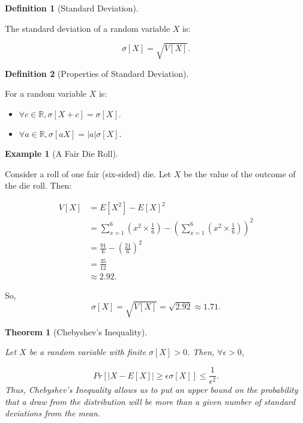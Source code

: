 \documentclass[
]{article}
\providecommand{\tightlist}{%
  \setlength{\itemsep}{0pt}\setlength{\parskip}{0pt}}
\newtheorem{theorem}{Theorem}[section]
\theoremstyle{definition}
\newtheorem{definition}{Definition}[section]
\theoremstyle{definition}
\newtheorem{example}{Example}[section]
\theoremstyle{definition}
\theoremstyle{remark}
\begin{document}
\begin{definition}[Standard Deviation]
\protect\hypertarget{def:unlabeled-div-69}{}\label{def:unlabeled-div-69}

The standard deviation of a random variable \(X\) is:

\[\sigma[X] = \sqrt{V[X]}.\]

\end{definition}

\begin{definition}[Properties of Standard Deviation]
\protect\hypertarget{def:unlabeled-div-70}{}\label{def:unlabeled-div-70}

For a random variable \(X\) is:

\begin{itemize}
\tightlist
\item
  \(\forall c \in \mathbb{R}, \sigma[X + c] = \sigma[X].\)
\item
  \(\forall a \in \mathbb{R}, \sigma[aX] = \left| a \right|\sigma[X].\)
\end{itemize}

\end{definition}

\begin{example}[A Fair Die Roll]
\protect\hypertarget{exm:unlabeled-div-71}{}\label{exm:unlabeled-div-71}

Consider a roll of one fair (six-sided) die. Let \(X\) be the value of the outcome of the die roll. Then:

\begin{align}
V[X] &= E[X^2] - E[X]^2 \\
     &= \sum_{x = 1}^6(x^2 \times \frac{1}{6}) - (\sum_{x = 1}^6(x^2 \times \frac{1}{6}))^2 \\
     &= \frac{91}{6} - (\frac{21}{6})^2 \\
     &= \frac{35}{12} \\
     &\approx 2.92.
\end{align}

So,
\[\sigma[X] = \sqrt{V[X]} = \sqrt{2.92} \approx 1.71.\]

\end{example}

\begin{theorem}[Chebyshev's Inequality]
\protect\hypertarget{thm:unlabeled-div-72}{}\label{thm:unlabeled-div-72}

Let \(X\) be a random variable with finite \(\sigma[X] > 0\). Then, \(\forall \epsilon > 0\),

\[Pr[\left| X - E[X] \right| \geq \epsilon \sigma [X]] \leq \frac{1}{\epsilon^2}.\]
Thus, \emph{Chebyshev's Inequality} allows us to put an upper bound on the probability that a draw from the distribution will be more than a given number of standard deviations from the mean.

\end{theorem}
\end{document}
